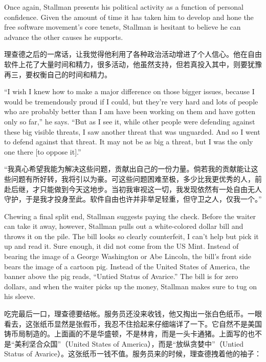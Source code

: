 \ifdefined\eng
Once again, Stallman presents his political activity as a function of personal confidence. Given the amount of time it has taken him to develop and hone the free software movement's core tenets, Stallman is hesitant to believe he can advance the other causes he supports.
\fi

\ifdefined\chs
理查德之后的一席话，让我觉得他利用了各种政治活动增进了个人信心。他在自由软件上花了大量时间和精力，很多活动，他虽然支持，但若真投入其中，则要犹豫再三，要权衡自己的时间和精力。
\fi

\ifdefined\eng
``I wish I knew how to make a major difference on those bigger issues, because I would be tremendously proud if I could, but they're very hard and lots of people who are probably better than I am have been working on them and have gotten only so far,'' he says. ``But as I see it, while other people were defending against these big visible threats, I saw another threat that was unguarded. And so I went to defend against that threat. It may not be as big a threat, but I was the only one there [to oppose it].''
\fi

\ifdefined\chs
“我真心希望我能为解决这些问题，贡献出自己的一份力量。倘若我的贡献能让这些问题有所好转，我将引以为豪。可这些问题困难至极，多少比我更优秀的人，前赴后继，才只能做到今天这地步。当初我审视这一切，我发现依然有一处自由无人守护，于是我才投身至此。软件自由也许并非举足轻重，但守卫之人，仅我一个。”
\fi

\ifdefined\eng
Chewing a final split end, Stallman suggests paying the check. Before the waiter can take it away, however, Stallman pulls out a white-colored dollar bill and throws it on the pile. The bill looks so clearly counterfeit, I can't help but pick it up and read it. Sure enough, it did not come from the US Mint. Instead of bearing the image of a George Washington or Abe Lincoln, the bill's front side bears the image of a cartoon pig. Instead of the United States of America, the banner above the pig reads, ``Untied Status of Avarice.'' The bill is for zero dollars, and when the waiter picks up the money, Stallman makes sure to tug on his sleeve.
\fi

\ifdefined\chs
吃完最后一口，理查德要结帐。服务员还没来收钱，他又掏出一张白色纸币。一眼看去，这张纸币显然是张假币，我忍不住拾起来仔细端详了一下。它自然不是美国铸币局制造的。上面画的不是华盛顿，不是林肯，而是一头卡通猪。上面写的也不是“美利坚合众国”（United States of America），而是“放纵贪婪中”（Untied Status of Avarice）。这张纸币一钱不值。服务员来的时候，理查德拽着他的袖子：
\fi


